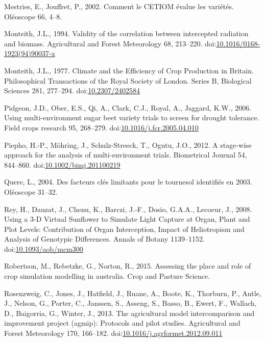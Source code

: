 \documentclass[a4paper]{article}
\begin{document}
\hypertarget{ref-Mestries2002}{}
Mestries, E., Jouffret, P., 2002. Comment le CETIOM évalue les variétés.
Oléoscope 66, 4--8.

\hypertarget{ref-Monteith1994}{}
Monteith, J.L., 1994. Validity of the correlation between intercepted
radiation and biomass. Agricultural and Forest Meteorology 68, 213--220.
doi:\href{https://doi.org/10.1016/0168-1923(94)90037-x}{10.1016/0168-1923(94)90037-x}

\hypertarget{ref-Monteith1977}{}
Monteith, J.L., 1977. Climate and the Efficiency of Crop Production in
Britain. Philosophical Transactions of the Royal Society of London.
Series B, Biological Sciences 281, 277--294.
doi:\href{https://doi.org/10.2307/2402584}{10.2307/2402584}

\hypertarget{ref-Pidgeon2006}{}
Pidgeon, J.D., Ober, E.S., Qi, A., Clark, C.J., Royal, A., Jaggard,
K.W., 2006. Using multi-environment sugar beet variety trials to screen
for drought tolerance. Field crops research 95, 268--279.
doi:\href{https://doi.org/10.1016/j.fcr.2005.04.010}{10.1016/j.fcr.2005.04.010}

\hypertarget{ref-Piepho2012}{}
Piepho, H.-P., Möhring, J., Schulz-Streeck, T., Ogutu, J.O., 2012. A
stage-wise approach for the analysis of multi-environment trials.
Biometrical Journal 54, 844--860.
doi:\href{https://doi.org/10.1002/bimj.201100219}{10.1002/bimj.201100219}

\hypertarget{ref-Quere2004}{}
Quere, L., 2004. Des facteurs clés limitants pour le tournesol
identifiés en 2003. Oléoscope 31--32.

\hypertarget{ref-Rey2008}{}
Rey, H., Dauzat, J., Chenu, K., Barczi, J.-F., Dosio, G.A.A., Lecoeur,
J., 2008. Using a 3-D Virtual Sunflower to Simulate Light Capture at
Organ, Plant and Plot Levels: Contribution of Organ Interception, Impact
of Heliotropism and Analysis of Genotypic Differences. Annals of Botany
1139--1152.
doi:\href{https://doi.org/10.1093/aob/mcm300}{10.1093/aob/mcm300}

\hypertarget{ref-Robertson2015}{}
Robertson, M., Rebetzke, G., Norton, R., 2015. Assessing the place and
role of crop simulation modelling in australia. Crop and Pasture
Science.

\hypertarget{ref-Rosenzweig2013}{}
Rosenzweig, C., Jones, J., Hatfield, J., Ruane, A., Boote, K., Thorburn,
P., Antle, J., Nelson, G., Porter, C., Janssen, S., Asseng, S., Basso,
B., Ewert, F., Wallach, D., Baigorria, G., Winter, J., 2013. The
agricultural model intercomparison and improvement project (agmip):
Protocols and pilot studies. Agricultural and Forest Meteorology 170,
166--182.
doi:\href{https://doi.org/10.1016/j.agrformet.2012.09.011}{10.1016/j.agrformet.2012.09.011}
\end{document}

